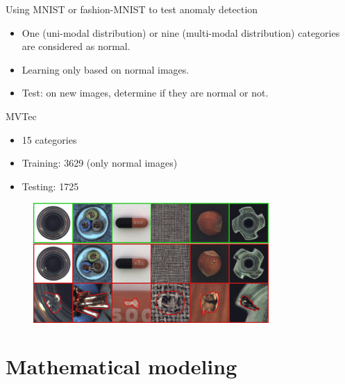 \documentclass[xcolor=pdftex,dvipsnames,table,mathserif]{beamer}
\begin{document}
\begin{frame}{Using MNIST or fashion-MNIST to test anomaly detection}

\begin{itemize}
\item One (uni-modal distribution) or nine (multi-modal distribution) categories are considered as normal.
\item Learning only based on normal images.
\item Test: on new images, determine if they are normal or not.
\end{itemize}

\end{frame}



\begin{frame}{MVTec~\tiny{\cite{bergmann_mvtec_2019}}}

\begin{itemize}
\item 15 categories
\item Training: 3629 (only normal images)
\item Testing: 1725
\end{itemize}

\begin{figure}[ht]
  \centering
  \includegraphics[width=0.8\textwidth]{mvtec}
\end{figure}


\end{frame}



\section{Mathematical modeling}
\end{document}
